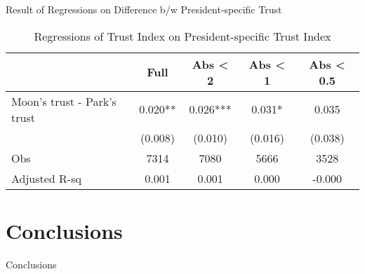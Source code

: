 \documentclass[
  ignorenonframetext,
]{beamer}
\begin{document}
\begin{frame}{Result of Regressions on Difference b/w President-specific
Trust}
\protect\hypertarget{result-of-regressions-on-difference-bw-president-specific-trust}{}
\begin{table}

\caption{\label{tab:kableRegTrustidOnDiff2Trustid}Regressions of Trust Index on President-specific Trust Index}
\centering
\fontsize{9}{11}\selectfont
\begin{tabular}[t]{lcccc}
\toprule
 & Full & Abs < 2 & Abs < 1 & Abs < 0.5\\
\midrule
Moon's trust - Park's trust & 0.020** & 0.026*** & 0.031* & 0.035\\
 & (0.008) & (0.010) & (0.016) & (0.038)\\
Obs & 7314 & 7080 & 5666 & 3528\\
Adjusted R-sq & 0.001 & 0.001 & 0.000 & -0.000\\
\bottomrule
\end{tabular}
\end{table}
\end{frame}

\hypertarget{conclusions}{%
\section{Conclusions}\label{conclusions}}

\begin{frame}{Conclusions}
\protect\hypertarget{conclusions-1}{}
\end{frame}
\end{document}
